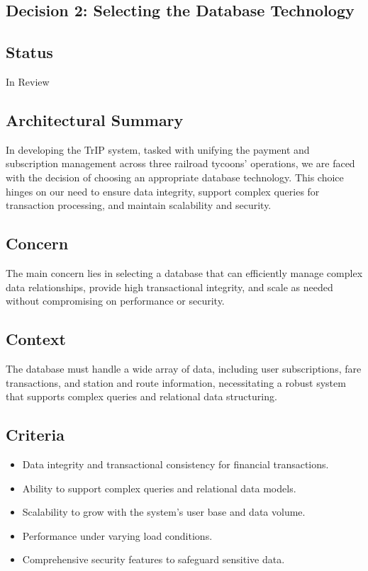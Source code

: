 \subsection{Decision 2: Selecting the Database Technology}

\subsection*{Status}
In Review

\subsection*{Architectural Summary}
In developing the TrIP system, tasked with unifying the payment and subscription management across three railroad tycoons' operations, we are faced with the decision of choosing an appropriate database technology. This choice hinges on our need to ensure data integrity, support complex queries for transaction processing, and maintain scalability and security.

\subsection*{Concern}
The main concern lies in selecting a database that can efficiently manage complex data relationships, provide high transactional integrity, and scale as needed without compromising on performance or security.

\subsection*{Context}
The database must handle a wide array of data, including user subscriptions, fare transactions, and station and route information, necessitating a robust system that supports complex queries and relational data structuring.

\subsection*{Criteria}
\begin{itemize}
    \item Data integrity and transactional consistency for financial transactions.
    \item Ability to support complex queries and relational data models.
    \item Scalability to grow with the system's user base and data volume.
    \item Performance under varying load conditions.
    \item Comprehensive security features to safeguard sensitive data.
\end{itemize}

